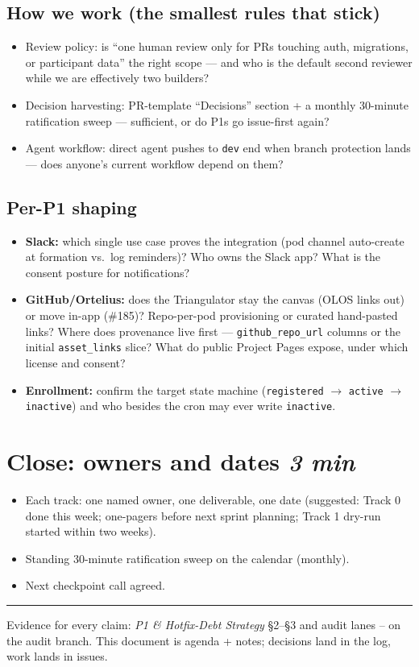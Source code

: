\documentclass[10pt]{article}
\newcommand{\gh}[1]{\mbox{\##1}}
\newcommand{\tbox}[1]{\hfill {\normalsize\normalfont\itshape #1}}
\begin{document}
\subsection{How we work (the smallest rules that stick)}
\begin{itemize}
  \item Review policy: is ``one human review only for PRs touching auth, migrations, or participant data'' the right scope --- and who is the default second reviewer while we are effectively two builders?
  \item Decision harvesting: PR-template ``Decisions'' section + a monthly 30-minute ratification sweep --- sufficient, or do P1s go issue-first again?
  \item Agent workflow: direct agent pushes to \texttt{dev} end when branch protection lands --- does anyone's current workflow depend on them?
\end{itemize}
\subsection{Per-P1 shaping}
\begin{itemize}
  \item \textbf{Slack:} which single use case proves the integration (pod channel auto-create at formation vs.\ log reminders)? Who owns the Slack app? What is the consent posture for notifications?
  \item \textbf{GitHub/Ortelius:} does the Triangulator stay the canvas (OLOS links out) or move in-app (\gh{185})? Repo-per-pod provisioning or curated hand-pasted links? Where does provenance live first --- \texttt{github\_repo\_url} columns or the initial \texttt{asset\_links} slice? What do public Project Pages expose, under which license and consent?
  \item \textbf{Enrollment:} confirm the target state machine (\texttt{registered} $\rightarrow$ \texttt{active} $\rightarrow$ \texttt{inactive}) and who besides the cron may ever write \texttt{inactive}.
\end{itemize}

\section{Close: owners and dates \tbox{3 min}}
\begin{itemize}
  \item Each track: one named owner, one deliverable, one date (suggested: Track 0 done this week; one-pagers before next sprint planning; Track 1 dry-run started within two weeks).
  \item Standing 30-minute ratification sweep on the calendar (monthly).
  \item Next checkpoint call agreed.
\end{itemize}

\vspace{4pt}\hrule\vspace{3pt}
{\footnotesize Evidence for every claim: \emph{P1 \& Hotfix-Debt Strategy} \S2--\S3 and audit lanes -- on the audit branch. This document is agenda + notes; decisions land in the log, work lands in issues.}
\end{document}
